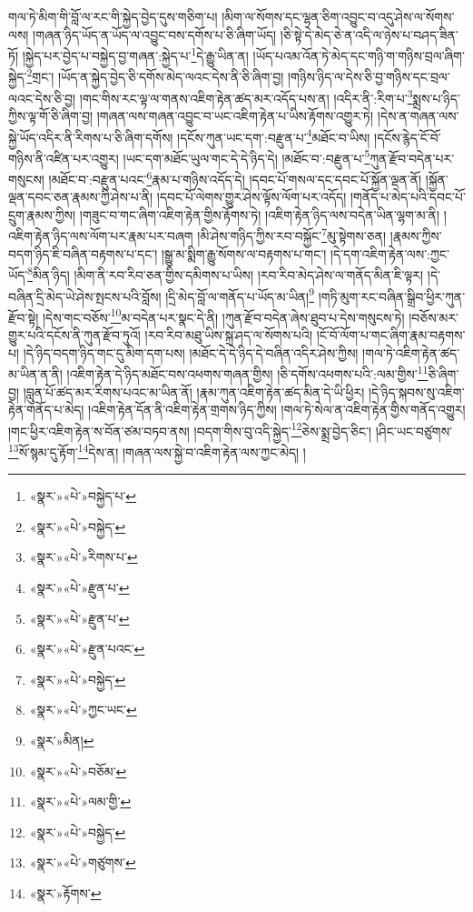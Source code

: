 གལ་ཏེ་མིག་གི་བློ་ལ་རང་གི་སྐྱེད་བྱེད་དུས་གཅིག་པ། །མིག་ལ་སོགས་དང་ལྷན་ཅིག་འབྱུང་བ་འདུ་ཤེས་ལ་སོགས་ལས། །གཞན་ཉིད་ཡོད་ན་ཡོད་ལ་འབྱུང་བས་དགོས་པ་ཅི་ཞིག་ཡོད། །ཅི་སྟེ་དེ་མེད་ཅེ་ན་འདི་ལ་ཉེས་པ་བཤད་ཟིན་ཏོ། །སྐྱེད་པར་བྱེད་པ་བསྐྱེད་བྱ་གཞན་:སྐྱེད་པ་\footnote{«སྣར་»«པེ་»བསྐྱེད་པ་}དེ་རྒྱུ་ཡིན་ན། །ཡོད་པའམ་འོན་ཏེ་མེད་དང་གཉི་ག་གཉིས་བྲལ་ཞིག་སྐྱེད་\footnote{«སྣར་»«པེ་»བསྐྱེད་}གྲང་། །ཡོད་ན་སྐྱེད་བྱེད་ཅི་དགོས་མེད་ལའང་དེས་ནི་ཅི་ཞིག་བྱ། །གཉིས་ཉིད་ལ་དེས་ཅི་བྱ་གཉིས་དང་བྲལ་ལའང་དེས་ཅི་བྱ། །གང་གིས་རང་ལྟ་ལ་གནས་འཇིག་རྟེན་ཚད་མར་འདོད་པས་ན། །འདིར་ནི་:རིག་པ་\footnote{«སྣར་»«པེ་»རིགས་པ་}སྨྲས་པ་ཉིད་ཀྱིས་ལྟ་གོ་ཅི་ཞིག་བྱ། །གཞན་ལས་གཞན་འབྱུང་བ་ཡང་འཇིག་རྟེན་པ་ཡིས་རྟོགས་འགྱུར་ཏེ། །དེས་ན་གཞན་ལས་སྐྱེ་ཡོད་འདིར་ནི་རིགས་པ་ཅི་ཞིག་དགོས། །དངོས་ཀུན་ཡང་དག་:བརྫུན་པ་\footnote{«སྣར་»«པེ་»རྫུན་པ་}མཐོང་བ་ཡིས། །དངོས་རྙེད་ངོ་བོ་གཉིས་ནི་འཛིན་པར་འགྱུར། །ཡང་དག་མཐོང་ཡུལ་གང་དེ་དེ་ཉིད་དེ། །མཐོང་བ་:བརྫུན་པ་\footnote{«སྣར་»«པེ་»རྫུན་པ་}ཀུན་རྫོབ་བདེན་པར་གསུངས། །མཐོང་བ་:བརྫུན་པའང་\footnote{«སྣར་»«པེ་»རྫུན་པའང་}རྣམ་པ་གཉིས་འདོད་དེ། །དབང་པོ་གསལ་དང་དབང་པོ་སྐྱོན་ལྡན་ནོ། །སྐྱོན་ལྡན་དབང་ཅན་རྣམས་ཀྱི་ཤེས་པ་ནི། །དབང་པོ་ལེགས་གྱུར་ཤེས་ལྟོས་ལོག་པར་འདོད། །གནོད་པ་མེད་པའི་དབང་པོ་དྲུག་རྣམས་ཀྱིས། །གཟུང་བ་གང་ཞིག་འཇིག་རྟེན་གྱིས་རྟོགས་ཏེ། །འཇིག་རྟེན་ཉིད་ལས་བདེན་ཡིན་ལྷག་མ་ནི། །འཇིག་རྟེན་ཉིད་ལས་ལོག་པར་རྣམ་པར་བཞག །མི་ཤེས་གཉིད་ཀྱིས་རབ་བསྐྱོང་\footnote{«སྣར་»«པེ་»བསྐྱེད་}མུ་སྟེགས་ཅན། །རྣམས་ཀྱིས་བདག་ཉིད་ཇི་བཞིན་བརྟགས་པ་དང་། །སྒྱུ་མ་སྨིག་རྒྱུ་སོགས་ལ་བརྟགས་པ་གང་། །དེ་དག་འཇིག་རྟེན་ལས་:ཀྱང་ཡོད་\footnote{«སྣར་»«པེ་»ཀྱང་ཡང་}མིན་ཉིད། །མིག་ནི་རབ་རིབ་ཅན་གྱིས་དམིགས་པ་ཡིས། །རབ་རིབ་མེད་ཤེས་ལ་གནོད་མིན་ཇི་ལྟར། །དེ་བཞིན་དྲི་མེད་ཡེ་ཤེས་སྤངས་པའི་བློས། །དྲི་མེད་བློ་ལ་གནོད་པ་ཡོད་མ་ཡིན།\footnote{«སྣར་»མིན།} །གཏི་མུག་རང་བཞིན་སྒྲིབ་ཕྱིར་ཀུན་རྫོབ་སྟེ། །དེས་གང་བཅོས་\footnote{«སྣར་»«པེ་»བཅོམ་}མ་བདེན་པར་སྣང་དེ་ནི། །ཀུན་རྫོབ་བདེན་ཞེས་ཐུབ་པ་དེས་གསུངས་ཏེ། །བཅོས་མར་གྱུར་པའི་དངོས་ནི་ཀུན་རྫོབ་ཏུའོ། །རབ་རིབ་མཐུ་ཡིས་སྐྲ་ཤད་ལ་སོགས་པའི། །ངོ་བོ་ལོག་པ་གང་ཞིག་རྣམ་བརྟགས་པ། །དེ་ཉིད་བདག་ཉིད་གང་དུ་མིག་དག་པས། །མཐོང་དེ་དེ་ཉིད་དེ་བཞིན་འདིར་ཤེས་ཀྱིས། །གལ་ཏེ་འཇིག་རྟེན་ཚད་མ་ཡིན་ན་ནི། །འཇིག་རྟེན་དེ་ཉིད་མཐོང་བས་འཕགས་གཞན་གྱིས། །ཅི་དགོས་འཕགས་པའི་:ལམ་གྱིས་\footnote{«སྣར་»«པེ་»ལམ་གྱི་}ཅི་ཞིག་བྱ། །བླུན་པོ་ཚད་མར་རིགས་པའང་མ་ཡིན་ནོ། །རྣམ་ཀུན་འཇིག་རྟེན་ཚད་མིན་དེ་ཡི་ཕྱིར། །དེ་ཉིད་སྐབས་སུ་འཇིག་རྟེན་གནོད་པ་མེད། །འཇིག་རྟེན་དོན་ནི་འཇིག་རྟེན་གྲགས་ཉིད་ཀྱིས། །གལ་ཏེ་སེལ་ན་འཇིག་རྟེན་གྱིས་གནོད་འགྱུར། །གང་ཕྱིར་འཇིག་རྟེན་ས་བོན་ཙམ་བཏབ་ནས། །བདག་གིས་བུ་འདི་སྐྱེད་\footnote{«སྣར་»«པེ་»བསྐྱེད་}ཅེས་སྨྲ་བྱེད་ཅིང་། །ཤིང་ཡང་བཙུགས་\footnote{«སྣར་»«པེ་»གཙུགས་}སོ་སྙམ་དུ་རྟོག་\footnote{«སྣར་»རྟོགས་}དེས་ན། །གཞན་ལས་སྐྱེ་བ་འཇིག་རྟེན་ལས་ཀྱང་མེད། །
